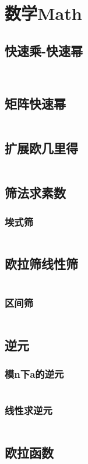 \documentclass[twoside,sub3section,UTF8]{ctexart}						%
\begin{document}
\newpage
\section{数学Math}
	
	\subsection{快速乘-快速幂}
		\inputminted{c++}{"Maths/fastmul.cpp"}
		\inputminted{c++}{"Maths/fastpow.cpp"}
	\subsection{矩阵快速幂}
		\inputminted{c++}{"Maths/MatrixFastpow.cpp"}	
	\subsection{扩展欧几里得}
		\inputminted{c++}{"Maths/exgcd.cpp"}
	\subsection{筛法求素数}
		\subsubsection{埃式筛}
			\inputminted{c++}{"Maths/Prime/EratosthenesSieve.cpp"}
		\subsection{欧拉筛线性筛}
			\inputminted{c++}{"Maths/Prime/EularSieve.cpp"}
		\subsubsection{区间筛}
			\inputminted{c++}{"Maths/Prime/SegmentSieve.cpp"}
	\subsection{逆元}
		\subsubsection{模n下a的逆元}
			\inputminted{c++}{"Maths/Rev/模n下a的逆元.cpp"}
		\subsubsection{线性求逆元}
			\inputminted{c++}{"Maths/Rev/线性求逆元.cpp"}
	\subsection{欧拉函数}
		\inputminted{c++}{"Maths/Elur.cpp"}
\end{document}
